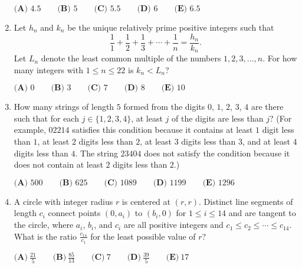 \documentclass{article}
\begin{document}
\begin{enumerate}[label=\arabic*., itemsep=0.5em]
\(\textbf{(A) }4.5 \qquad\textbf{(B) }5 \qquad\textbf{(C) }5.5 \qquad\textbf{(D) }6\qquad\textbf{(E) }6.5\)\par \vspace{0.5em}\item Let \(h_n\) and \(k_n\) be the unique relatively prime positive integers such that 
\begin{equation*}
\frac{1}{1}+\frac{1}{2}+\frac{1}{3}+\cdots+\frac{1}{n}=\frac{h_n}{k_n}.
\end{equation*}
 Let \(L_n\) denote the least common multiple of the numbers \(1, 2, 3, \ldots, n\). For how many integers with \(1\le{n}\le{22}\) is \(k_n<L_n\)?

\(\textbf{(A) }0 \qquad\textbf{(B) }3 \qquad\textbf{(C) }7 \qquad\textbf{(D) }8\qquad\textbf{(E) }10\)\par \vspace{0.5em}\item How many strings of length \(5\) formed from the digits \(0\), \(1\), \(2\), \(3\), \(4\) are there such that for each \(j \in \{1,2,3,4\}\), at least \(j\) of the digits are less than \(j\)? (For example, \(02214\) satisfies this condition
because it contains at least \(1\) digit less than \(1\), at least \(2\) digits less than \(2\), at least \(3\) digits less
than \(3\), and at least \(4\) digits less than \(4\). The string \(23404\) does not satisfy the condition because it
does not contain at least \(2\) digits less than \(2\).)

\(\textbf{(A) }500\qquad\textbf{(B) }625\qquad\textbf{(C) }1089\qquad\textbf{(D) }1199\qquad\textbf{(E) }1296\)\par \vspace{0.5em}\item A circle with integer radius \(r\) is centered at \((r, r)\). Distinct line segments of length \(c_i\) connect points \((0, a_i)\) to \((b_i, 0)\) for \(1 \le i \le 14\) and are tangent to the circle, where \(a_i\), \(b_i\), and \(c_i\) are all positive integers and \(c_1 \le c_2 \le \cdots \le c_{14}\). What is the ratio \(\frac{c_{14}}{c_1}\) for the least possible value of \(r\)?

\(\textbf{(A)} ~\frac{21}{5} \qquad\textbf{(B)} ~\frac{85}{13} \qquad\textbf{(C)} ~7 \qquad\textbf{(D)} ~\frac{39}{5} \qquad\textbf{(E)} ~17 \)\par \vspace{0.5em}\end{enumerate}
\end{document}
